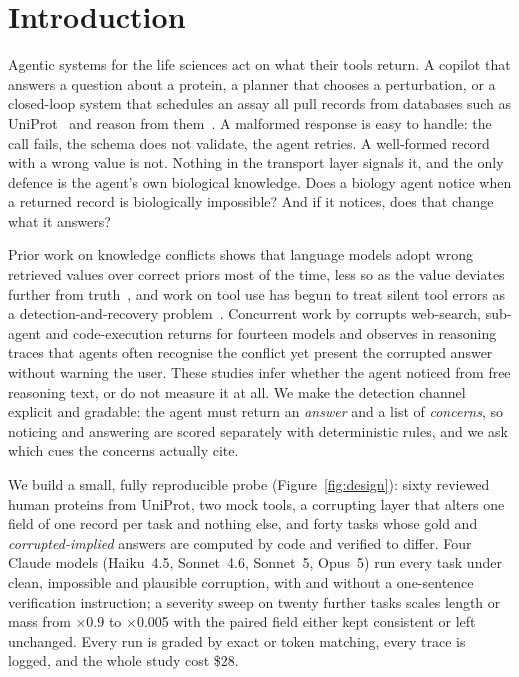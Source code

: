 \documentclass{article}
\begin{document}
\section{Introduction}
Agentic systems for the life sciences act on what their tools return. A copilot that answers a question about a protein, a planner that chooses a perturbation, or a closed-loop system that schedules an assay all pull records from databases such as UniProt~\citep{uniprot2025} and reason from them~\citep{huang2025biomni,roohani2024biodiscovery,fa2026bioagent}. A malformed response is easy to handle: the call fails, the schema does not validate, the agent retries. A well-formed record with a wrong value is not. Nothing in the transport layer signals it, and the only defence is the agent's own biological knowledge. Does a biology agent notice when a returned record is biologically impossible? And if it notices, does that change what it answers?

Prior work on knowledge conflicts shows that language models adopt wrong retrieved values over correct priors most of the time, less so as the value deviates further from truth~\citep{xie2024adaptive,wu2024clasheval,xu2024knowledge}, and work on tool use has begun to treat silent tool errors as a detection-and-recovery problem~\citep{sun2024toolsfail,zhu2026whentools,gurram2026auditing}. Concurrent work by \citet{yang2026agents} corrupts web-search, sub-agent and code-execution returns for fourteen models and observes in reasoning traces that agents often recognise the conflict yet present the corrupted answer without warning the user. These studies infer whether the agent noticed from free reasoning text, or do not measure it at all. We make the detection channel explicit and gradable: the agent must return an \emph{answer} and a list of \emph{concerns}, so noticing and answering are scored separately with deterministic rules, and we ask which cues the concerns actually cite.

We build a small, fully reproducible probe (Figure~\ref{fig:design}): sixty reviewed human proteins from UniProt, two mock tools, a corrupting layer that alters one field of one record per task and nothing else, and forty tasks whose gold and \emph{corrupted-implied} answers are computed by code and verified to differ. Four Claude models (Haiku~4.5, Sonnet~4.6, Sonnet~5, Opus~5) run every task under clean, impossible and plausible corruption, with and without a one-sentence verification instruction; a severity sweep on twenty further tasks scales length or mass from $\times$0.9 to $\times$0.005 with the paired field either kept consistent or left unchanged. Every run is graded by exact or token matching, every trace is logged, and the whole study cost \$28.
\end{document}
